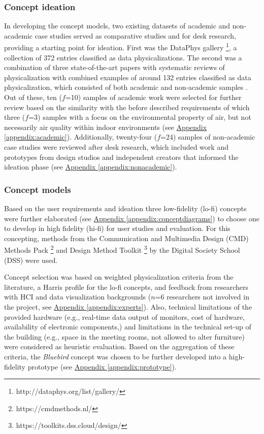 \subsubsection{Concept ideation}
In developing the concept models, two existing datasets of academic and non-academic case studies served as comparative studies and for desk research, providing a starting point for ideation. First was the DataPhys gallery \footnote{http://dataphys.org/list/gallery/}, a collection of 372 entries classified as data physicalizations. The second was a combination of three state-of-the-art papers with systematic reviews of physicalization with combined examples of around 132 entries classified as data physicalization, which consisted of both academic and non-academic samples \cite{sauve_physecology_2022, anhalt_university_germany_design_2022, ranasinghe_encoding_2023}. Out of these, ten ($f$=10) samples of academic work were selected for further review based on the similarity with the before described requirements of which three ($f$=3) samples with a focus on the environmental property of air, but not necessarily air quality within indoor environments (see \hyperref[appendix:academic]{Appendix \ref*{appendix:academic}}). Additionally, twenty-four ($f$=24) samples of non-academic case studies were reviewed after desk research, which included work and prototypes from design studios and independent creators that informed the ideation phase (see \hyperref[appendix:nonacademic]{Appendix \ref*{appendix:nonacademic}}).

\subsubsection{Concept models}

Based on the user requirements and ideation three low-fidelity (lo-fi) concepts were further elaborated (see \hyperref[appendix:conceptdiagrams]{Appendix \ref*{appendix:conceptdiagrams}}) to choose one to develop in high fidelity (hi-fi) for user studies and evaluation. For this concepting, methods from the Communication and Multimedia Design (CMD) Methods Pack \footnote{https://cmdmethods.nl/} and Design Method Toolkit \footnote{https://toolkits.dss.cloud/design/} by the Digital Society School (DSS) were used.

Concept selection was based on weighted physicalization criteria from the literature, a Harris profile for the lo-fi concepts, and feedback from researchers with HCI and data visualization backgrounds ($n$=6 researchers not involved in the project, see \hyperref[appendix:experts]{Appendix \ref*{appendix:experts}}). Also, technical limitations of the provided hardware (e.g., real-time data output of monitors, cost of hardware, availability of electronic components,) and limitations in the technical set-up of the building (e.g., space in the meeting rooms, not allowed to alter furniture) were considered as heuristic evaluation. Based on the aggregation of these criteria, the \textit{Bluebird} concept was chosen to be further developed into a high-fidelity prototype (see \hyperref[appendix:prototype]{Appendix \ref*{appendix:prototype}}).

